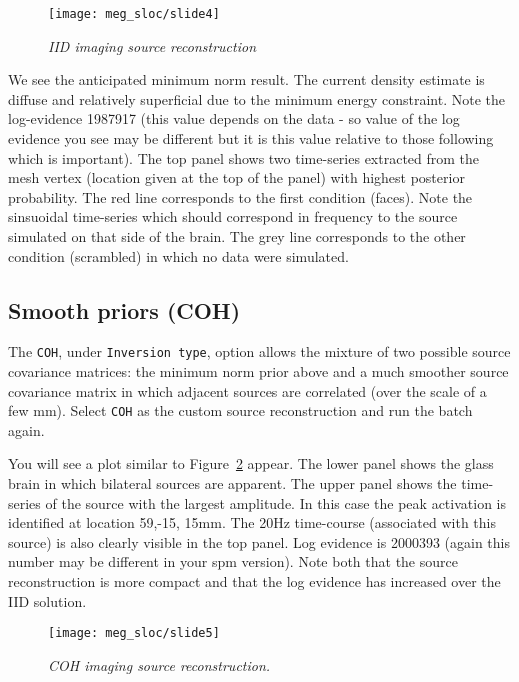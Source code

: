 \begin{figure}
\begin{center}
\texttt{[image: meg\_sloc/slide4]}
\caption{\em IID imaging source reconstruction \label{meg_sloc:fig:4}}
\end{center}
\end{figure}

 
We see the anticipated minimum norm result. The current density estimate is diffuse and relatively superficial due to the minimum energy constraint.  Note the log-evidence 1987917 (this value depends on the data - so value of the log evidence you see may be different but it is this value relative to those following which is important).
The top panel shows two time-series extracted from the mesh vertex (location given at the top of the panel) with highest posterior probability.  The red line corresponds to the first condition (faces). Note the sinsuoidal time-series which should correspond in frequency to the source simulated on that side of the brain. The grey line corresponds to the other condition (scrambled) in which no data were simulated.


\subsection{Smooth priors (COH)}
The \texttt{COH}, under \texttt{Inversion type}, option allows the mixture of two possible source covariance matrices: the minimum norm prior above and a much smoother source covariance matrix in which adjacent sources are correlated (over the scale of a few mm). Select \texttt{COH} as the custom source reconstruction and run the batch again.
 
 You will see a plot similar to Figure~\ref{meg_sloc:fig:5} appear. The lower panel shows the glass brain in which bilateral sources are apparent. The upper panel shows the time-series of the source with the largest amplitude. In this case the peak activation is identified at location 59,-15, 15mm. The 20Hz time-course (associated with this source) is also clearly visible in the top panel.  Log evidence is 2000393  (again this number may be different in your spm version). Note both that the source reconstruction is more compact and that the log evidence has increased over the IID solution.

\begin{figure}
\begin{center}
\texttt{[image: meg\_sloc/slide5]}
\caption{\em COH imaging source reconstruction.\label{meg_sloc:fig:5}}
\end{center}
\end{figure}



